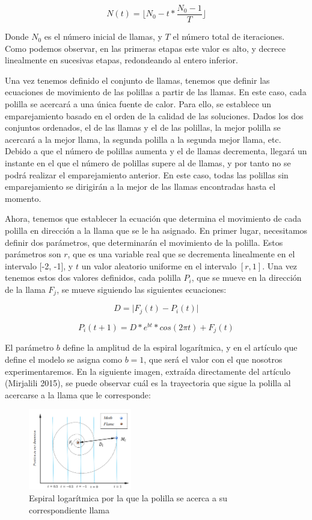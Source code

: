 \documentclass[
  a4paper,
,tablecaptionabove
]{scrartcl}
\begin{document}
\[ N(t) = \lfloor N_0 - t * \frac{N_0-1}{T} \rfloor \]

Donde \(N_0\) es el número inicial de llamas, y \(T\) el número total de
iteraciones. Como podemos observar, en las primeras etapas este valor es
alto, y decrece linealmente en sucesivas etapas, redondeando al entero
inferior.

Una vez tenemos definido el conjunto de llamas, tenemos que definir las
ecuaciones de movimiento de las polillas a partir de las llamas. En este
caso, cada polilla se acercará a una única fuente de calor. Para ello,
se establece un emparejamiento basado en el orden de la calidad de las
soluciones. Dados los dos conjuntos ordenados, el de las llamas y el de
las polillas, la mejor polilla se acercará a la mejor llama, la segunda
polilla a la segunda mejor llama, etc. Debido a que el número de
polillas aumenta y el de llamas decrementa, llegará un instante en el
que el número de polillas supere al de llamas, y por tanto no se podrá
realizar el emparejamiento anterior. En este caso, todas las polillas
sin emparejamiento se dirigirán a la mejor de las llamas encontradas
hasta el momento.

Ahora, tenemos que establecer la ecuación que determina el movimiento de
cada polilla en dirección a la llama que se le ha asignado. En primer
lugar, necesitamos definir dos parámetros, que determinarán el
movimiento de la polilla. Estos parámetros son \(r\), que es una
variable real que se decrementa linealmente en el intervalo {[}-2,
-1{]}, y \(t\) un valor aleatorio uniforme en el intervalo \([r, 1]\).
Una vez tenemos estos dos valores definidos, cada polilla \(P_i\), que
se mueve en la dirección de la llama \(F_j\), se mueve siguiendo las
siguientes ecuaciones:

\[ D = \lvert F_j(t) - P_i(t) \rvert \]

\[ P_i (t+1) = D* e^{bt}*cos(2 \pi t) + F_j(t) \]

El parámetro \(b\) define la amplitud de la espiral logarítmica, y en el
artículo que define el modelo se asigna como \(b=1\), que será el valor
con el que nosotros experimentaremos. En la siguiente imagen, extraída
directamente del artículo (Mirjalili 2015), se puede observar cuál es la
trayectoria que sigue la polilla al acercarse a la llama que le
corresponde:

\begin{figure}
\centering
\includegraphics[width=0.4\textwidth,height=\textheight]{imgs/spiral.png}
\caption{Espiral logarítmica por la que la polilla se acerca a su
correspondiente llama}
\end{figure}
\end{document}
